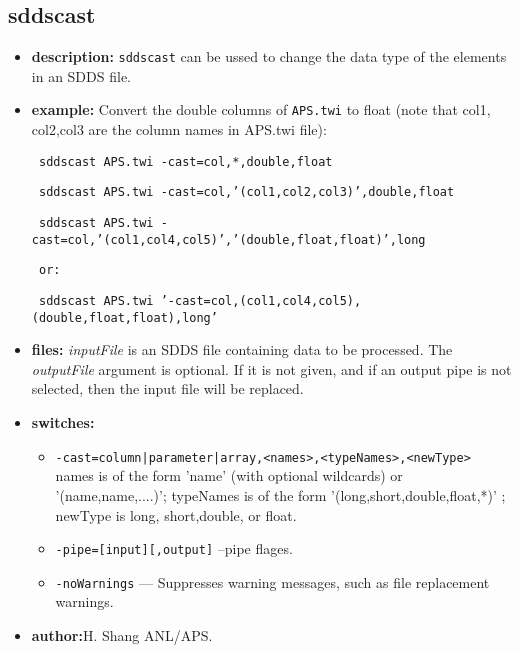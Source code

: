 \newpage
\subsection{sddscast}
\label{sddscast}

\begin{itemize}
\item {\bf description:} \verb|sddscast| can be ussed to change the data type of the
elements in an SDDS file. 
\item {\bf example:}
Convert the double columns of {\tt APS.twi} to float (note that col1, col2,col3
are the column names in APS.twi file):
\begin{flushleft}{\tt
sddscast APS.twi -cast=col,*,double,float
}\end{flushleft}
\begin{flushleft}{\tt
sddscast APS.twi -cast=col,'(col1,col2,col3)',double,float
}\end{flushleft}
\begin{flushleft}{\tt
sddscast APS.twi -cast=col,'(col1,col4,col5)','(double,float,float)',long
}\end{flushleft}
\begin{flushleft}{\tt
or:
}\end{flushleft}
\begin{flushleft}{\tt
sddscast APS.twi '-cast=col,(col1,col4,col5),(double,float,float),long'
}\end{flushleft}

\item {\bf files:}
{\em inputFile} is an SDDS file containing data to be processed.  The {\em outputFile} argument is
optional.  If it is not given, and if an output pipe is not selected, then the input file will be
replaced.
\item {\bf switches:}
    \begin{itemize}
    \item {\tt -cast={column|parameter|array},<names>,<typeNames>,<newType>}
          names is of the form 'name' (with optional wildcards) or
                     '(name,name,....)'; 
          typeNames is of the form '(long,short,double,float,*)' ;
          newType is long, short,double, or float.
    \item {\tt -pipe=[input][,output]} --pipe flages.
    \item {\tt -noWarnings} --- Suppresses warning messages, such as file replacement warnings.
    \end{itemize}
\item {\bf author:}H. Shang ANL/APS.
\end{itemize}



